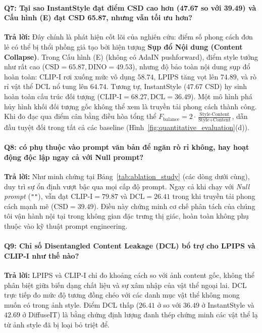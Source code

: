 \documentclass[runningheads]{llncs}
\begin{document}
\paragraph{Q7: Tại sao InstantStyle đạt điểm CSD cao hơn (47.67 so với 39.49) và Cấu hình (E) đạt CSD 65.87, nhưng \method vẫn tối ưu hơn?}
\textbf{Trả lời:} Đây chính là phát hiện cốt lõi của nghiên cứu: điểm số phong cách đơn lẻ có thể bị thổi phồng giả tạo bởi hiện tượng \textbf{Sụp đổ Nội dung (Content Collapse)}. Trong Cấu hình (E) (không có AdaIN pushforward), điểm style tưởng như rất cao ($\text{CSD} = 65.87, \text{DINO} = 49.53$), nhưng độ bảo toàn nội dung sụp đổ hoàn toàn: $\text{CLIP-I}$ rơi xuống mức vô dụng $58.74$, $\text{LPIPS}$ tăng vọt lên $74.89$, và rò rỉ vật thể $\text{DCL}$ nổ tung lên $64.74$. Tương tự, InstantStyle ($47.67$ CSD) hy sinh hoàn toàn cấu trúc đối tượng ($\text{CLIP-I} = 68.27, \text{DCL} = 36.49$). Một mô hình phá hủy hình khối đối tượng gốc không thể xem là truyền tải phong cách thành công. Khi đo đạc qua điểm cân bằng điều hòa tổng thể $F_{\text{balance}} = 2 \cdot \frac{\text{Style} \cdot \text{Content}}{\text{Style} + \text{Content}}$, \method dẫn đầu tuyệt đối trong tất cả các baseline (Hình~\ref{fig:quantitative_evaluation}(d)).

\paragraph{Q8: \method có phụ thuộc vào prompt văn bản để ngăn rò rỉ không, hay hoạt động độc lập ngay cả với Null prompt?}
\textbf{Trả lời:} Như minh chứng tại Bảng~\ref{tab:ablation_study} (các dòng dưới cùng), \method duy trì sự ổn định vượt bậc qua mọi cấp độ prompt. Ngay cả khi chạy với \textit{Null prompt} (\texttt{""}), \method vẫn đạt $\text{CLIP-I} = 79.87$ và $\text{DCL} = 26.41$ trong khi truyền tải phong cách mạnh mẽ ($\text{CSD} = 39.49$). Điều này chứng minh cơ chế phân tách của chúng tôi vận hành nội tại trong không gian đặc trưng thị giác, hoàn toàn không phụ thuộc vào kỹ thuật prompt engineering.

\paragraph{Q9: Chỉ số Disentangled Content Leakage (DCL) bổ trợ cho LPIPS và CLIP-I như thế nào?}
\textbf{Trả lời:} LPIPS và CLIP-I chỉ đo khoảng cách so với ảnh content gốc, không thể phân biệt giữa biến dạng chất liệu và sự xâm nhập của vật thể ngoại lai. DCL trực tiếp đo mức độ tương đồng chéo với các danh mục vật thể không mong muốn có trong ảnh style. Điểm DCL thấp ($26.41$ ở \method so với $36.49$ ở InstantStyle và $42.69$ ở DiffuseIT) là bằng chứng định lượng đanh thép chứng minh các vật thể lạ từ ảnh style đã bị loại bỏ triệt để.
\end{document}
